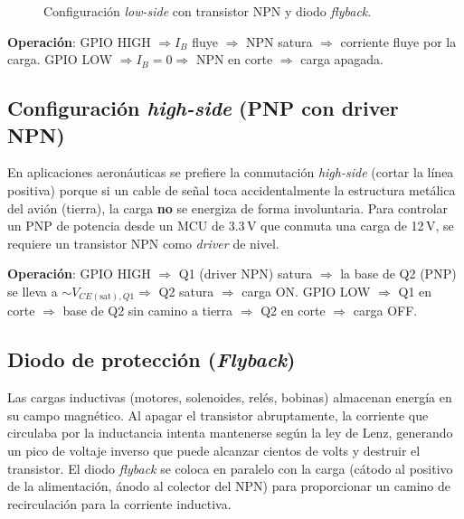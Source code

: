 \documentclass[11pt]{article}
\begin{document}
\begin{figure}[H]\centering
{}
\caption{Configuración \emph{low-side} con transistor NPN y diodo \emph{flyback}.}
\end{figure}

\textbf{Operación}: GPIO HIGH $\Rightarrow I_B$ fluye $\Rightarrow$ NPN satura
$\Rightarrow$ corriente fluye por la carga. GPIO LOW $\Rightarrow I_B=0
\Rightarrow$ NPN en corte $\Rightarrow$ carga apagada.

\subsection{Configuración \emph{high-side} (PNP con driver NPN)}
En aplicaciones aeronáuticas se prefiere la conmutación \emph{high-side} (cortar la línea
positiva) porque si un cable de señal toca accidentalmente la estructura metálica del
avión (tierra), la carga \textbf{no} se energiza de forma involuntaria. Para controlar un
PNP de potencia desde un MCU de 3.3\,V que conmuta una carga de 12\,V, se requiere un
transistor NPN como \emph{driver} de nivel.

\textbf{Operación}: GPIO HIGH $\Rightarrow$ Q1 (driver NPN) satura $\Rightarrow$ la base
de Q2 (PNP) se lleva a $\sim V_{CE(\text{sat}),Q1} \Rightarrow$ Q2 satura $\Rightarrow$
carga ON. GPIO LOW $\Rightarrow$ Q1 en corte $\Rightarrow$ base de Q2 sin camino a
tierra $\Rightarrow$ Q2 en corte $\Rightarrow$ carga OFF.

\subsection{Diodo de protección (\emph{Flyback})}
Las cargas inductivas (motores, solenoides, relés, bobinas) almacenan energía en su campo
magnético. Al apagar el transistor abruptamente, la corriente que circulaba por la
inductancia intenta mantenerse según la ley de Lenz, generando un pico de voltaje inverso
que puede alcanzar cientos de volts y destruir el transistor. El diodo \emph{flyback} se
coloca en paralelo con la carga (cátodo al positivo de la alimentación, ánodo al colector
del NPN) para proporcionar un camino de recirculación para la corriente inductiva.
\end{document}

